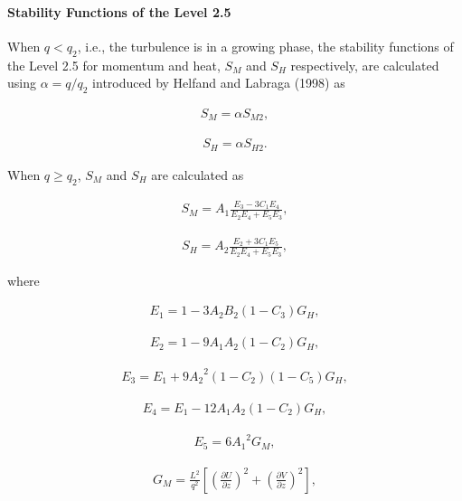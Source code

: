 \hypertarget{stability-functions-of-the-level-2.5}{%
\paragraph{Stability Functions of the Level
2.5}\label{stability-functions-of-the-level-2.5}}

When \(q<q_2\), i.e., the turbulence is in a growing phase, the
stability functions of the Level 2.5 for momentum and heat, \(S_M\) and
\(S_H\) respectively, are calculated using \(\alpha=q/q_2\) introduced
by Helfand and Labraga (1998) as

\begin{eqnarray}S_M=\alpha S_{M2},\end{eqnarray}

\begin{eqnarray}S_H=\alpha S_{H2}.\end{eqnarray}

When \(q \geq q_2\), \(S_M\) and \(S_H\) are calculated as

\begin{eqnarray}S_M=A_1\frac{E_3-3C_1 E_4}{E_2 E_4+E_5 E_3},\end{eqnarray}

\begin{eqnarray}S_H=A_2\frac{E_2+3C_1 E_5}{E_2 E_4+E_5 E_3},\end{eqnarray}

where

\begin{eqnarray}E_1=1-3A_2B_2(1-C_3)G_H,\end{eqnarray}

\begin{eqnarray}E_2=1-9A_1A_2(1-C_2)G_H,\end{eqnarray}

\begin{eqnarray}E_3=E_1+9{A_2}^2(1-C_2)(1-C_5)G_H,\end{eqnarray}

\begin{eqnarray}E_4=E_1-12A_1A_2(1-C_2)G_H,\end{eqnarray}

\begin{eqnarray}E_5=6{A_1}^2G_M,\end{eqnarray}

\begin{eqnarray}G_M=\frac{L^2}{q^2}\left[\left(\frac{\partial U}{\partial z}\right)^2+\left(\frac{\partial V}{\partial z}\right)^2\right],\end{eqnarray}

